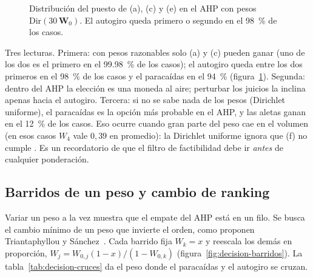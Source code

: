 \begin{figure}[H]
\centering
{}
\caption{Distribución del puesto de (a), (c) y (e) en el AHP con pesos
$\mathrm{Dir}(30\,\mathbf{W}_0)$. El autogiro queda primero o segundo en el
\SI{98}{\percent} de los casos.}
\label{fig:decision-rangos}
\end{figure}

Tres lecturas. Primera: con pesos razonables solo (a) y (c) pueden ganar (uno de los dos es el primero
en el \SI{99.98}{\percent} de los casos); el autogiro queda entre los dos primeros en el
\SI{98}{\percent} de los casos y el paracaídas en el \SI{94}{\percent}
(figura~\ref{fig:decision-rangos}).
Segunda: dentro del AHP la elección es una moneda al aire; perturbar los juicios la
inclina apenas hacia el autogiro. Tercera: si no se sabe nada de los pesos (Dirichlet
uniforme), el paracaídas es la opción más probable en el AHP, y las aletas ganan en el
\SI{12}{\percent} de los casos. Eso ocurre cuando gran parte del peso cae en el volumen (en esos casos
$W_4$ vale $0{,}39$ en promedio):
la Dirichlet uniforme ignora que (f) no cumple . Es un recordatorio de que el
filtro de factibilidad debe ir \emph{antes} de cualquier ponderación.

\subsection{Barridos de un peso y cambio de ranking}
Variar un peso a la vez muestra que el empate del AHP está en un filo. Se busca el
cambio mínimo de un peso que invierte el orden, como proponen Triantaphyllou y
Sánchez~\cite{decision-triantaphyllou1997}. Cada barrido fija
$W_k=x$ y reescala los demás en proporción, $W_j=W_{0,j}(1-x)/(1-W_{0,k})$
(figura~\ref{fig:decision-barridos}). La tabla~\ref{tab:decision-cruces} da el peso donde
el paracaídas y el autogiro se cruzan.

